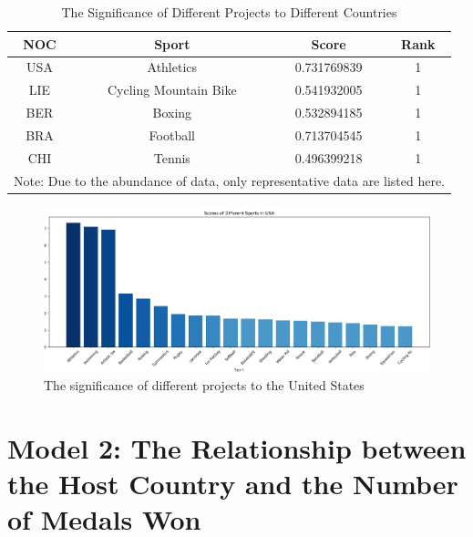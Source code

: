 \documentclass{mcmthesis}  %
\begin{document}
\begin{itemize}
\begin{table}[H]  %
\caption{The Significance of Different Projects to Different Countries}  %
\tabcolsep 30pt %
\begin{tabular*}{\textwidth}{cccc}  %
\toprule  %
NOC & Sport & Score & Rank \\
\midrule  %
USA & Athletics & 0.731769839 & 1 \\
\midrule  %
LIE & Cycling Mountain Bike & 0.541932005 & 1 \\
\midrule  %
BER & Boxing & 0.532894185 & 1 \\
\midrule  %
BRA & Football & 0.713704545 & 1 \\
\midrule  %
CHI & Tennis & 0.496399218 & 1 \\
\midrule  %
\multicolumn{4}{c}{Note: Due to the abundance of data, only representative data are listed here.}
\end{tabular*}  %
\end{table}  %
\begin{figure}[H]  %
\small
\centering  %
\includegraphics[width=14cm]{usa.png}  %
\caption{The significance of different projects to the United States}  %
\end{figure}  %

\end{itemize}  %

\section{Model 2: The Relationship between the Host Country and the Number of Medals Won}  %
\end{document}
